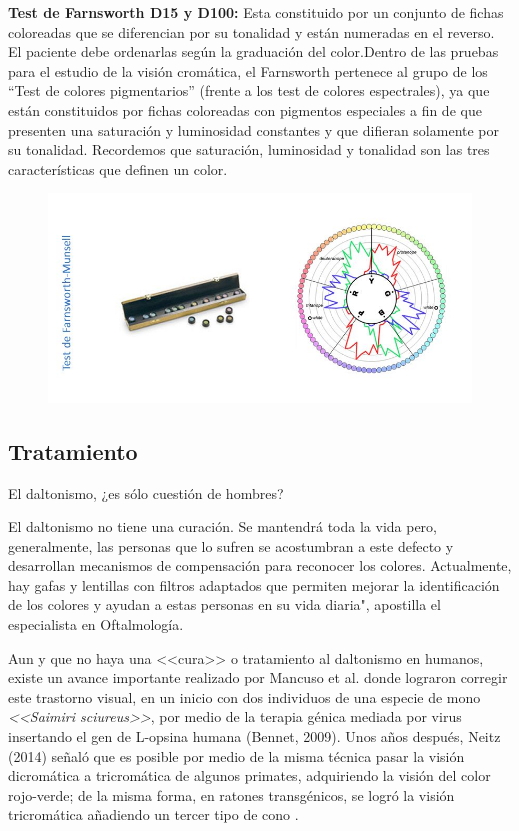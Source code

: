 \documentclass[10pt]{article}
\begin{document}
\textbf{Test de Farnsworth D15 y D100:} Esta constituido por un conjunto de fichas coloreadas que se diferencian por su tonalidad y están numeradas en el reverso. El paciente debe ordenarlas según la graduación del color.Dentro de las pruebas para el estudio de la visión cromática, el Farnsworth pertenece al grupo de los “Test de colores pigmentarios” (frente a los test de colores espectrales), ya que están constituidos por fichas coloreadas con pigmentos especiales a fin de que presenten una saturación y luminosidad constantes y que difieran solamente por su tonalidad. Recordemos que
saturación, luminosidad y tonalidad son las tres características que definen un color\cite{IEEEreferencias:Ref31}.

\begin{figure}[H]
	\begin{center}
\includegraphics[scale = 0.55]{Imagenes/fm.jpg}
	\end{center} 
\end{figure}

\subsection{Tratamiento}
El daltonismo, ¿es sólo cuestión de hombres?

El daltonismo no tiene una curación. Se mantendrá toda la vida pero, generalmente, las personas que lo sufren se acostumbran a este defecto y desarrollan mecanismos de compensación para reconocer los colores. Actualmente, hay gafas y lentillas con filtros adaptados que permiten mejorar la identificación de los colores y ayudan a estas personas en su vida diaria", apostilla el especialista en Oftalmología\cite{IEEEreferencias:Ref26}.

Aun y que no haya una <<cura>> o tratamiento al daltonismo en humanos, existe un avance importante realizado por Mancuso et al. donde lograron corregir este trastorno visual, en un inicio con dos individuos de una especie de mono \textit{<<Saimiri sciureus>>}, por medio de la terapia génica mediada por virus insertando el gen de L-opsina humana (Bennet, 2009). Unos años después, Neitz (2014) señaló que es posible por medio de la misma técnica pasar la visión dicromática a tricromática de algunos primates, adquiriendo la visión del color rojo-verde; de la misma forma, en ratones transgénicos, se logró la visión tricromática añadiendo un tercer tipo de cono \cite{IEEEreferencias:Ref26}.
\end{document}
